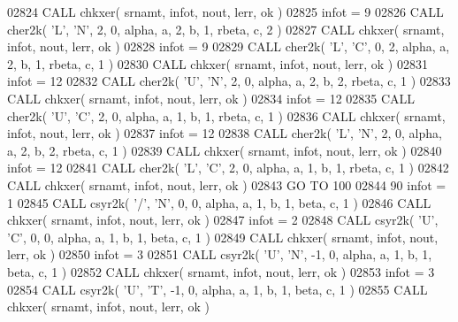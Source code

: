 \begin{DoxyCode}
02824       \textcolor{keyword}{CALL }chkxer( srnamt, infot, nout, lerr, ok )
02825       infot = 9
02826       \textcolor{keyword}{CALL }cher2k( \textcolor{stringliteral}{'L'}, \textcolor{stringliteral}{'N'}, 2, 0, alpha, a, 2, b, 1, rbeta, c, 2 )
02827       \textcolor{keyword}{CALL }chkxer( srnamt, infot, nout, lerr, ok )
02828       infot = 9
02829       \textcolor{keyword}{CALL }cher2k( \textcolor{stringliteral}{'L'}, \textcolor{stringliteral}{'C'}, 0, 2, alpha, a, 2, b, 1, rbeta, c, 1 )
02830       \textcolor{keyword}{CALL }chkxer( srnamt, infot, nout, lerr, ok )
02831       infot = 12
02832       \textcolor{keyword}{CALL }cher2k( \textcolor{stringliteral}{'U'}, \textcolor{stringliteral}{'N'}, 2, 0, alpha, a, 2, b, 2, rbeta, c, 1 )
02833       \textcolor{keyword}{CALL }chkxer( srnamt, infot, nout, lerr, ok )
02834       infot = 12
02835       \textcolor{keyword}{CALL }cher2k( \textcolor{stringliteral}{'U'}, \textcolor{stringliteral}{'C'}, 2, 0, alpha, a, 1, b, 1, rbeta, c, 1 )
02836       \textcolor{keyword}{CALL }chkxer( srnamt, infot, nout, lerr, ok )
02837       infot = 12
02838       \textcolor{keyword}{CALL }cher2k( \textcolor{stringliteral}{'L'}, \textcolor{stringliteral}{'N'}, 2, 0, alpha, a, 2, b, 2, rbeta, c, 1 )
02839       \textcolor{keyword}{CALL }chkxer( srnamt, infot, nout, lerr, ok )
02840       infot = 12
02841       \textcolor{keyword}{CALL }cher2k( \textcolor{stringliteral}{'L'}, \textcolor{stringliteral}{'C'}, 2, 0, alpha, a, 1, b, 1, rbeta, c, 1 )
02842       \textcolor{keyword}{CALL }chkxer( srnamt, infot, nout, lerr, ok )
02843       \textcolor{keywordflow}{GO TO} 100
02844    90 infot = 1
02845       \textcolor{keyword}{CALL }csyr2k( \textcolor{stringliteral}{'/'}, \textcolor{stringliteral}{'N'}, 0, 0, alpha, a, 1, b, 1, beta, c, 1 )
02846       \textcolor{keyword}{CALL }chkxer( srnamt, infot, nout, lerr, ok )
02847       infot = 2
02848       \textcolor{keyword}{CALL }csyr2k( \textcolor{stringliteral}{'U'}, \textcolor{stringliteral}{'C'}, 0, 0, alpha, a, 1, b, 1, beta, c, 1 )
02849       \textcolor{keyword}{CALL }chkxer( srnamt, infot, nout, lerr, ok )
02850       infot = 3
02851       \textcolor{keyword}{CALL }csyr2k( \textcolor{stringliteral}{'U'}, \textcolor{stringliteral}{'N'}, -1, 0, alpha, a, 1, b, 1, beta, c, 1 )
02852       \textcolor{keyword}{CALL }chkxer( srnamt, infot, nout, lerr, ok )
02853       infot = 3
02854       \textcolor{keyword}{CALL }csyr2k( \textcolor{stringliteral}{'U'}, \textcolor{stringliteral}{'T'}, -1, 0, alpha, a, 1, b, 1, beta, c, 1 )
02855       \textcolor{keyword}{CALL }chkxer( srnamt, infot, nout, lerr, ok )

\end{DoxyCode}
